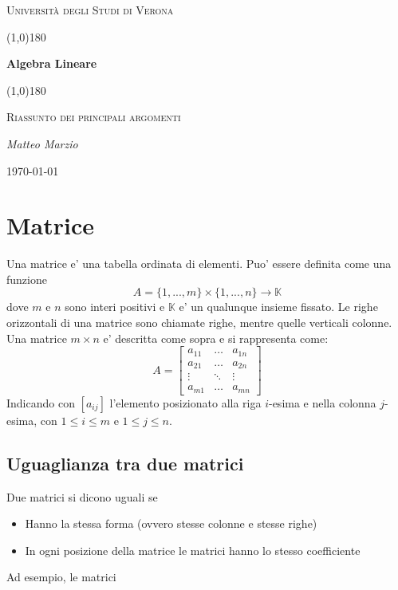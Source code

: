 \documentclass[a4paper, 10pt]{article}
\begin{document}
	\clearpage
	
	\begin{titlepage}
	\centering
	\vspace*{\fill}
	{\scshape\LARGE Università degli Studi di Verona \par}
	\vspace{1.5cm}
	\line(1,0){180} \\
	{\huge\bfseries Algebra Lineare\par}
	\line(1,0){180} \\
	\vspace{0.5cm}
	{\scshape\Large Riassunto dei principali argomenti\par}
	\vspace{2cm}
	{\Large\itshape Matteo Marzio\par}
	\vspace{1cm}
	\vspace{5cm}
	\vspace*{\fill}
	{\large \today\par}
\end{titlepage}
	{
		\color{black}
		\thispagestyle{empty}
	}
	\tableofcontents
	
	\newpage
	\section{Matrice}
	Una matrice e' una tabella ordinata di elementi. Puo' essere definita come una funzione 
		\[
			A = \lbrace 1, ... , m \rbrace \times \lbrace 1 , ..., n \rbrace  \rightarrow \mathbb{K}
		\]
	dove $m$ e $n$ sono interi positivi e $\mathbb{K}$ e' un qualunque insieme fissato. 
	Le righe orizzontali di una matrice sono chiamate righe, mentre quelle verticali colonne. 
	Una matrice $m \times n$ e' descritta come sopra e si rappresenta come:
		\[
		A =
		\begin{bmatrix}
			a_{11} & \dots & a_{1n} \\
			a_{21} & \dots & a_{2n} \\
			\vdots & \ddots & \vdots \\
			a_{m1} & \dots & a_{mn}
		
		\end{bmatrix}
		\]
	Indicando con $[a_{ij}]$ l'elemento posizionato alla riga $i$-esima e nella colonna $j$-esima, 
	con $1 \leq i \leq m$ e $1 \leq j \leq n$.
	
	\subsection{Uguaglianza tra due matrici}
	Due matrici si dicono uguali se 
		\begin{itemize}
			\item Hanno la stessa forma (ovvero stesse colonne e stesse righe)
			\item In ogni posizione della matrice le matrici hanno lo stesso coefficiente
		\end{itemize}
	Ad esempio, le matrici 
		
\end{document}
